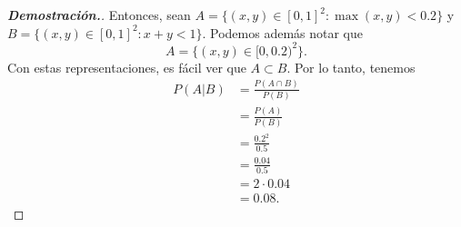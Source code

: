 \documentclass{article}
\begin{document}
\begin{enumerate}
\begin{mdframed}[
			linecolor=darkgray,
			backgroundcolor=pearl]
\begin{proof}[\textbf{Demostraci\'on.}]
				Entonces, sean $A = \{(x,y)\in [0,1]^2 : \max(x,y) < 0.2\}$ y $B = \{(x,y)\in [0,1]^2 : x+y<1\}$. Podemos adem\'as notar que \[ A = \{(x,y)\in [0,0.2)^2\}. \] Con estas representaciones, es f\'acil ver que $A\subset B$. Por lo tanto, tenemos
				\begin{align*}
					P(A|B) &= \frac{P(A\cap B)}{P(B)}\\ &= \frac{P(A)}{P(B)}\\ &= \frac{0.2^2}{0.5}\\ &= \frac{0.04}{0.5}\\ &= 2\cdot 0.04\\ &= 0.08.
				\end{align*} 
			\end{proof}
		\end{mdframed}
	\end{enumerate}
\end{document}
